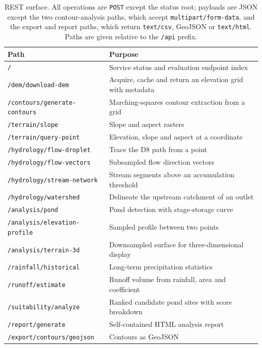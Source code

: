 \documentclass[sigconf,review,10pt]{acmart}
\newcommand{\cb}{\allowbreak}
\newcommand{\codelong}[1]{\texttt{#1}}
\begin{document}
\begin{table}[t]
\caption{REST surface. All operations are \texttt{POST} except the status
root; payloads are JSON except the two contour-analysis paths, which
accept \texttt{multipart/form-data}, and the export and report paths, which
return \texttt{text/csv}, GeoJSON or \texttt{text/html}. Paths are given
relative to the \texttt{/api} prefix.}
\label{tab:api}
\small
\begin{tabular}{@{}R{5.6cm}R{10.9cm}@{}}
\toprule
\textbf{Path} & \textbf{Purpose} \\
\midrule
\texttt{/} & Service status and evaluation endpoint index \\
\texttt{/dem/download-dem} & Acquire, cache and return an elevation grid with metadata \\
\codelong{/\cb{}contours/\cb{}generate-contours} & Marching-squares contour extraction from a grid \\
\texttt{/terrain/slope} & Slope and aspect rasters \\
\codelong{/\cb{}terrain/\cb{}query-point} & Elevation, slope and aspect at a coordinate \\
\codelong{/\cb{}hydrology/\cb{}flow-droplet} & Trace the D8 path from a point \\
\codelong{/\cb{}hydrology/\cb{}flow-vectors} & Subsampled flow direction vectors \\
\codelong{/\cb{}hydrology/\cb{}stream-network} & Stream segments above an accumulation threshold \\
\codelong{/\cb{}hydrology/\cb{}watershed} & Delineate the upstream catchment of an outlet \cite{mark2006} \\
\texttt{/analysis/pond} & Pond detection with stage-storage curve \\
\codelong{/\cb{}analysis/\cb{}elevation-profile} & Sampled profile between two points \\
\codelong{/\cb{}analysis/\cb{}terrain-3d} & Downsampled surface for three-dimensional display \\
\codelong{/\cb{}rainfall/\cb{}historical} & Long-term precipitation statistics \cite{openmeteo} \\
\texttt{/runoff/estimate} & Runoff volume from rainfall, area and coefficient \\
\codelong{/\cb{}suitability/\cb{}analyze} & Ranked candidate pond sites with score breakdown \\
\texttt{/report/generate} & Self-contained HTML analysis report \\
\codelong{/\cb{}export/\cb{}contours/\cb{}geojson} & Contours as GeoJSON \\

\end{tabular}
\end{table}
\end{document}
